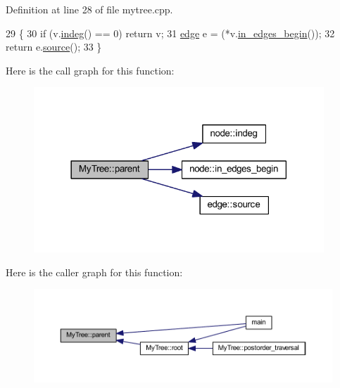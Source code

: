 Definition at line 28 of file mytree.\+cpp.


\begin{DoxyCode}
29 \{
30     \textcolor{keywordflow}{if} (v.\mbox{\hyperlink{classnode_a749bfd1316584b96f8c9b0e44ad512f0}{indeg}}() == 0) \textcolor{keywordflow}{return} v;
31     \mbox{\hyperlink{classedge}{edge}} e = (*v.\mbox{\hyperlink{classnode_a0c32377f370ae52ed2134ff8d4dac584}{in\_edges\_begin}}());
32     \textcolor{keywordflow}{return} e.\mbox{\hyperlink{classedge_ae82d5701f7e6f71edc3c8b0e34bcd2b7}{source}}();
33 \}
\end{DoxyCode}
Here is the call graph for this function\+:\nopagebreak
\begin{figure}[H]
\begin{center}
\leavevmode
\includegraphics[width=309pt]{class_my_tree_a6dd1940094f32e411a4107c01a6997fb_cgraph}
\end{center}
\end{figure}
Here is the caller graph for this function\+:\nopagebreak
\begin{figure}[H]
\begin{center}
\leavevmode
\includegraphics[width=350pt]{class_my_tree_a6dd1940094f32e411a4107c01a6997fb_icgraph}
\end{center}
\end{figure}
\mbox{\label{classgraph_a870633528590b7925cd27776bdd2bbd2}} 
